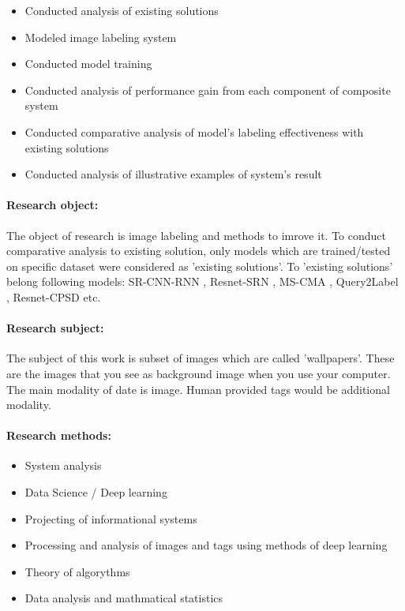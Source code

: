 \documentclass{udstu}
\begin{document}
\begin{itemize}
	\item Conducted analysis of existing solutions
	\item Modeled image labeling system
	\item Conducted model training
	\item Conducted analysis of performance gain from each component of composite system
	\item Conducted comparative analysis of model's labeling effectiveness
	with existing solutions
	\item Conducted analysis of illustrative examples of system's result
\end{itemize}

\paragraph{\textbf{Research object:}}
The object of research is image labeling and methods to imrove it.
To conduct comparative analysis to existing solution, only models which
are trained/tested on specific dataset were considered as 'existing solutions'.
To 'existing solutions' belong following models: SR-CNN-RNN \cite{sr-cnn-rnn}, Resnet-SRN \cite{srn},
MS-CMA \cite{cma}, Query2Label \cite{q2l}, Resnet-CPSD \cite{cpsd} etc.

\paragraph{\textbf{Research subject:}}
The subject of this work is subset of images which are called 'wallpapers'.
These are the images that you see as background image when you use your computer.
The main modality of date is image. Human provided tags would be additional modality.

\paragraph{\textbf{Research methods:}}
\begin{itemize}[*]
	\item System analysis
	\item Data Science / Deep learning
	\item Projecting of informational systems
	\item Processing and analysis of images and tags using methods of deep learning
	\item Theory of algorythms
	\item Data analysis and mathmatical statistics
\end{itemize}
\end{document}
